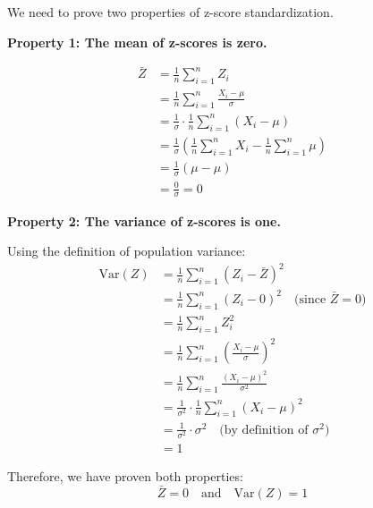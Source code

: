 \documentclass[12pt]{article}
\begin{document}
\begin{solution}
We need to prove two properties of z-score standardization.

\textbf{Property 1: The mean of z-scores is zero.}

\begin{align*}
\bar{Z} &= \frac{1}{n}\sum_{i=1}^{n} Z_i \\
&= \frac{1}{n}\sum_{i=1}^{n} \frac{X_i - \mu}{\sigma} \\
&= \frac{1}{\sigma} \cdot \frac{1}{n}\sum_{i=1}^{n} (X_i - \mu) \\
&= \frac{1}{\sigma} \left(\frac{1}{n}\sum_{i=1}^{n} X_i - \frac{1}{n}\sum_{i=1}^{n} \mu\right) \\
&= \frac{1}{\sigma} \left(\mu - \mu\right) \\
&= \frac{0}{\sigma} = 0
\end{align*}

\textbf{Property 2: The variance of z-scores is one.}

Using the definition of population variance:
\begin{align*}
\text{Var}(Z) &= \frac{1}{n}\sum_{i=1}^{n} (Z_i - \bar{Z})^2 \\
&= \frac{1}{n}\sum_{i=1}^{n} (Z_i - 0)^2 \quad \text{(since } \bar{Z} = 0\text{)} \\
&= \frac{1}{n}\sum_{i=1}^{n} Z_i^2 \\
&= \frac{1}{n}\sum_{i=1}^{n} \left(\frac{X_i - \mu}{\sigma}\right)^2 \\
&= \frac{1}{n}\sum_{i=1}^{n} \frac{(X_i - \mu)^2}{\sigma^2} \\
&= \frac{1}{\sigma^2} \cdot \frac{1}{n}\sum_{i=1}^{n} (X_i - \mu)^2 \\
&= \frac{1}{\sigma^2} \cdot \sigma^2 \quad \text{(by definition of } \sigma^2\text{)} \\
&= 1
\end{align*}

Therefore, we have proven both properties:
\[
\boxed{\bar{Z} = 0 \quad \text{and} \quad \text{Var}(Z) = 1}
\]
\end{solution}
\end{document}
